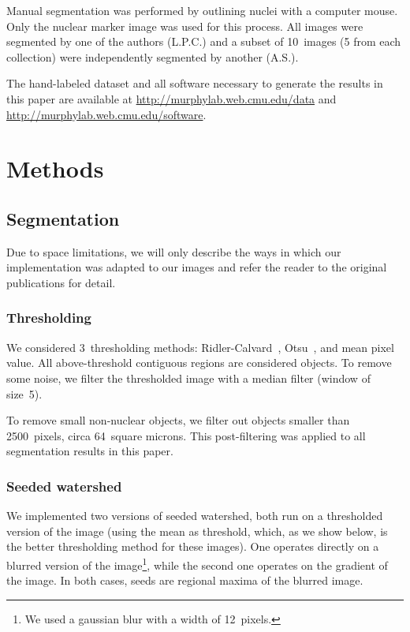 \documentclass{article}
\begin{document}
Manual segmentation was performed by outlining nuclei with a computer mouse. Only the nuclear marker image was used for this process. All images were segmented by one of the authors (L.P.C.) and a subset of 10~images (5 from each collection) were independently segmented by another (A.S.).  

The hand-labeled dataset and all software necessary to generate the results in this paper are available at \linebreak\href{http://murphylab.web.cmu.edu/data}{http://murphylab.web.cmu.edu/data} and \linebreak\href{http://murphylab.web.cmu.edu/software}{http://murphylab.web.cmu.edu/software}.

\section{Methods}\label{sec:method}

\subsection{Segmentation}

Due to space limitations, we will only describe the ways in which our implementation was adapted to our images and refer the reader to the original publications for detail.

\subsubsection{Thresholding}

We considered 3~thresholding methods: Ridler-Calvard~\cite{RCthresh}, Otsu~\cite{otsu_ieeetsmc_1979}, and mean pixel value. All above-threshold contiguous regions are considered objects. To remove some noise, we filter the thresholded image with a median filter (window of size~5).

To remove small non-nuclear objects, we filter out objects smaller than 2500~pixels, circa 64~square microns. This post-filtering was applied to all segmentation results in this paper.

\subsubsection{Seeded watershed}

We implemented two versions of seeded watershed, both run on a thresholded version of the image (using the mean as threshold, which, as we show below, is the better thresholding method for these images). One operates directly on a blurred version of the image\footnote{We used a gaussian blur with a width of 12~pixels.}, while the second one operates on the gradient of the image. In both cases, seeds are regional maxima of the blurred image.
\end{document}
